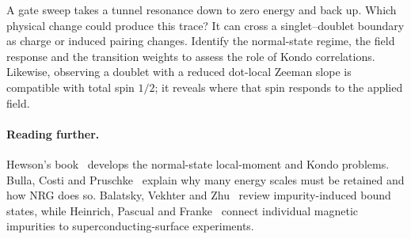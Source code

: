\begin{physics}
A gate sweep takes a tunnel resonance down to zero energy and back up. Which
physical change could produce this trace? It can cross a singlet--doublet boundary
as charge or induced pairing changes. Identify the normal-state regime, the field
response and the transition weights to assess the role of Kondo correlations. Likewise,
observing a doublet with a reduced dot-local Zeeman slope is compatible with
total spin $1/2$; it reveals where that spin responds to the applied field.
\end{physics}

\paragraph{Reading further.}
Hewson's book~\cite{hewson1993kondo} develops the normal-state local-moment and
Kondo problems. Bulla, Costi and Pruschke~\cite{bulla2008numerical} explain why
many energy scales must be retained and how NRG does so. Balatsky, Vekhter and
Zhu~\cite{balatsky2006impurity} review impurity-induced bound states, while
Heinrich, Pascual and Franke~\cite{heinrich2018single} connect individual
magnetic impurities to superconducting-surface experiments.
